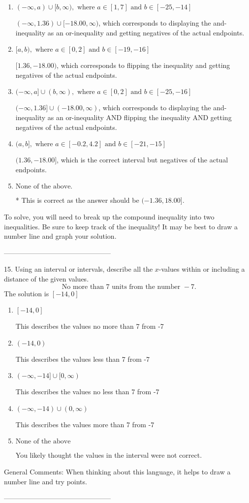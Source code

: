 \documentclass{extbook}[14pt]
\begin{document}
\begin{enumerate}[label=\Alph*.] 
\item $ (-\infty, a) \cup [b, \infty), \text{ where } a \in [1, 7] \text{ and } b \in [-25, -14] $ 

 $(-\infty, 1.36) \cup [-18.00, \infty)$, which corresponds to displaying the and-inequality as an or-inequality and getting negatives of the actual endpoints. 
\item $ [a, b), \text{ where } a \in [0, 2] \text{ and } b \in [-19, -16] $ 

 $[1.36, -18.00)$, which corresponds to flipping the inequality and getting negatives of the actual endpoints. 
\item $ (-\infty, a] \cup (b, \infty), \text{ where } a \in [0, 2] \text{ and } b \in [-25, -16] $ 

 $(-\infty, 1.36] \cup (-18.00, \infty)$, which corresponds to displaying the and-inequality as an or-inequality AND flipping the inequality AND getting negatives of the actual endpoints. 
\item $ (a, b], \text{ where } a \in [-0.2, 4.2] \text{ and } b \in [-21, -15] $ 

 $(1.36, -18.00]$, which is the correct interval but negatives of the actual endpoints. 
\item $ \text{None of the above.} $ 

 * This is correct as the answer should be $(-1.36, 18.00]$. 
\end{enumerate} 
 
To solve, you will need to break up the compound inequality into two inequalities. Be sure to keep track of the inequality! It may be best to draw a number line and graph your solution.

-----------------------------------------------

15. Using an interval or intervals, describe all the $x$-values within or including a distance of the given values.
\[ \text{ No more than } 7 \text{ units from the number } -7. \] 
The solution is $ [-14, 0] $ 

\begin{enumerate}[label=\Alph*.] 
\item $ [-14, 0] $ 

 This describes the values no more than 7 from -7 
\item $ (-14, 0) $ 

 This describes the values less than 7 from -7 
\item $ (-\infty, -14] \cup [0, \infty) $ 

 This describes the values no less than 7 from -7 
\item $ (-\infty, -14) \cup (0, \infty) $ 

 This describes the values more than 7 from -7 
\item $ \text{None of the above} $ 

 You likely thought the values in the interval were not correct. 
\end{enumerate} 
 
General Comments: When thinking about this language, it helps to draw a number line and try points.

-----------------------------------------------
\end{document}
